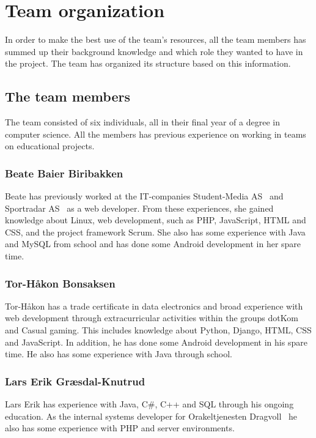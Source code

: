 \section{Team organization}
In order to make the best use of the team's resources, all the team members has summed up their background knowledge and which role they wanted to have in the project. The team has organized its structure based on this information.

\subsection{The team members}
The team consisted of six individuals, all in their final year of a degree in computer science. All the members has previous experience on working in teams on educational projects.

\subsubsection{Beate Baier Biribakken}
Beate has previously worked at the IT-companies Student-Media AS~\cite{studentmedia} and Sportradar AS~\cite{sportradar} as a web developer. From these experiences, she gained knowledge about Linux, web development, such as PHP, JavaScript, HTML and CSS, and the project framework Scrum. She also has some experience with Java and MySQL from school and has done some Android development in her spare time.

\subsubsection{Tor-Håkon Bonsaksen}
Tor-Håkon has a trade certificate in data electronics and broad experience with web development through extracurricular activities within the groups dotKom~\cite{dotkom} and Casual gaming\cite{casualgaming}. This includes knowledge about Python, Django, HTML, CSS and JavaScript. In addition, he has done some Android development in his spare time. He also has some experience with Java through school.

\subsubsection{Lars Erik Græsdal-Knutrud}
Lars Erik has experience with Java, C\#, C++ and SQL through his ongoing education. As the internal systems developer for Orakeltjenesten Dragvoll~\cite{orakeltjenesten} he also has some experience with PHP and server environments. 

